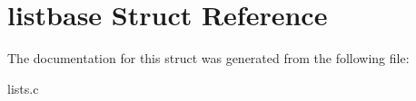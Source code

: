 \hypertarget{structlistbase}{}\section{listbase Struct Reference}
\label{structlistbase}


The documentation for this struct was generated from the following file\+:\begin{DoxyCompactItemize}
\item 
lists.\+c\end{DoxyCompactItemize}
